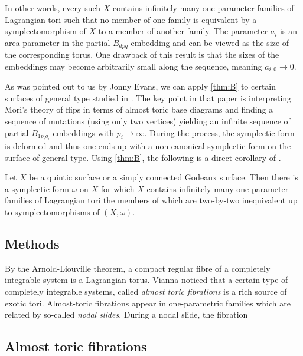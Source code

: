 \documentclass[12pt,a4paper,abstract=true,draft]{scrartcl}
\begin{document}
In other words, every such $X$ contains infinitely many one-parameter families of Lagrangian tori such that no member of one family is equivalent by a symplectomorphism of $X$ to a member of another family.
The parameter $a_i$ is an area parameter in the partial $B_{dpq}$-embedding and can be viewed as the size of the corresponding torus.
One drawback of this result is that the sizes of the embeddings may become arbitrarily small along the sequence, meaning $a_{i,0} \rightarrow 0$. 

As was pointed out to us by Jonny Evans, we can apply \cref{thm:B} to certain surfaces of general type studied in \cite{EvaUrz21}.
The key point in that paper is interpreting Mori's theory of flips in terms of almost toric base diagrams and finding a sequence of mutations (using only two vertices) yielding an infinite sequence of partial $B_{1p_iq_i}$-embeddings with $p_i \rightarrow \infty$.
During the process, the symplectic form is deformed and thus one ends up with a non-canonical symplectic form on the surface of general type.
Using \cref{thm:B}, the following is a direct corollary of \cite[Theorem 1.1]{EvaUrz21}.

\begin{corollary}
    \label{thm:quinticgodeaux}
    Let $X$ be a quintic surface or a simply connected Godeaux surface.
Then there is a symplectic form $\omega$ on $X$ for which $X$ contains infinitely many one-parameter families of Lagrangian tori the members of which are two-by-two inequivalent up to symplectomorphisms of $(X,\omega)$.
\end{corollary}

\subsection{Methods}

By the Arnold-Liouville theorem, a compact regular fibre of a completely integrable system is a Lagrangian torus. Vianna \cite{Via16,Via17} noticed that a certain type of completely integrable systems, called \emph{almost toric fibrations} is a rich source of exotic tori. Almost-toric fibrations appear in one-parametric families which are related by so-called \emph{nodal slides}. During a nodal slide, the fibration 



\subsection{Almost toric fibrations}
\label{sec:intro_atfs}
\end{document}
